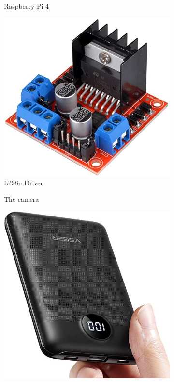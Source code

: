 \documentclass[12pt,a4paper]{article}
\begin{document}
\begin{large}
\begin{figure}[hb]
\begin{subfigure}{0.2\textwidth}
    \caption{Raspberry Pi 4}
    \label{fig:right}
    \end{subfigure}
  \begin{subfigure}{0.2\textwidth}
    \centering
    \includegraphics[width = \textwidth]{images/bridge.jpg}
    \caption{L298n Driver}
    \label{fig:right}
    \end{subfigure}
  \begin{subfigure}{0.2\textwidth}
    \centering
    \caption{The camera}
    \label{fig:right}
    \end{subfigure}
  \begin{subfigure}{0.2\textwidth}
    \centering
    \includegraphics[width = \textwidth]{images/powerbank.jpg}

\end{subfigure}
\end{figure}
\end{large}
\end{document}
